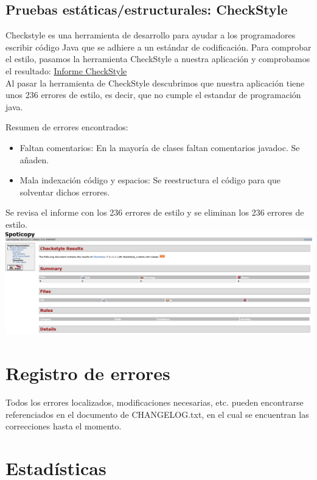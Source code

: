 \documentclass[12pt, a4paper, titlepage]{article}
\begin{document}
		\subsection{Pruebas estáticas/estructurales: CheckStyle}
		
		Checkstyle es una herramienta de desarrollo para ayudar a los programadores escribir código Java que se adhiere a un estándar de codificación. 
		Para comprobar el estilo, pasamos la herramienta CheckStyle a nuestra aplicación y comprobamos el resultado:
		\href{Informes/SiteTestInicial/checkstyle.html}{Informe CheckStyle} \\
		Al pasar la herramienta de CheckStyle descubrimos que nuestra aplicación tiene unos 236 errores de estilo, es decir, que no cumple el estandar de programación java.
		
		Resumen de errores encontrados:
		\begin{itemize}
		\item Faltan comentarios: En la mayoría de clases faltan comentarios javadoc. Se añaden.
		\item Mala indexación código y espacios: Se reestructura el código para que solventar dichos errores.
		\end{itemize}
		
		Se revisa el informe con los 236 errores de estilo y se eliminan los 236 errores de estilo.
		\includegraphics[width=15cm]{Imagenes/CheckStyleResut.png} \\
		
	\section{Registro de errores}
	
	Todos los errores localizados, modificaciones necesarias, etc. pueden encontrarse referenciados en el documento de CHANGELOG.txt, en el cual se encuentran las correcciones hasta el momento.
	
	\section{Estadísticas}
	
\end{document}
